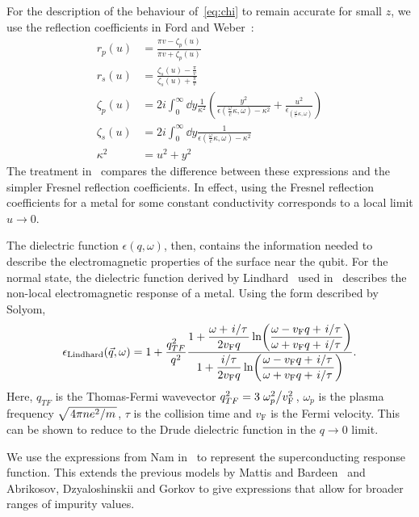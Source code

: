 \documentclass{article}
\newcommand{\vf}{v_{\mathrm{F}}}
\begin{document}
For the description of the behaviour of~\eqref{eq:chi} to remain accurate for small $z$, we use the reflection coefficients in Ford and Weber~\cite{Ford1984}:
\begin{align}
	r_p(u) &= \frac{\pi v - \zeta_p(u)}{\pi v + \zeta_p(u)} \\
	r_s(u) &= \frac{\zeta_s(u) - \frac{\pi}{v}}{\zeta_s(u) + \frac{\pi}{v}} \\
	\zeta_p(u) &= 2i \int_0^\infty \dd{y} \frac{1}{\kappa^2} \left( \frac{y^2}{\epsilon(\frac{\omega}{c}\kappa, \omega) - \kappa^2} + \frac{u^2}{\epsilon_(\frac{\omega}{c}\kappa, \omega)} \right) \label{eq:zp} \\
	\zeta_s(u) &= 2i \int_0^\infty \dd{y} \frac{1}{\epsilon(\frac{\omega}{c}\kappa, \omega) - \kappa^2} \label{eq:zs} \\
	\kappa^2 &= u^2 + y^2
\end{align}
The treatment in~\cite{QubitRelax} compares the difference between these expressions and the simpler Fresnel reflection coefficients.
In effect, using the Fresnel reflection coefficients for a metal for some constant conductivity corresponds to a local limit $u \rightarrow 0$.

The dielectric function $\epsilon(q, \omega)$, then, contains the information needed to describe the electromagnetic properties of the surface near the qubit.
For the normal state, the dielectric function derived by Lindhard~\cite{Lindhard} used in~\cite{QubitRelax} describes the non-local electromagnetic response of a metal.
Using the form described by Solyom\cite{SolyomV3},
\begin{equation}
	\epsilon_{\mathrm{Lindhard}}(\vec{q}, \omega) = 1 + \frac{q_{TF}^2}{q^2}\frac{\displaystyle 1 + \frac{\omega + \flatfrac{i}{\tau}}{2 \vf q} \ln(\frac{\omega - \vf q + \flatfrac{i}{\tau}}{\omega + \vf q + \flatfrac{i}{\tau}})}{\displaystyle 1 + \frac{\flatfrac{i}{\tau}}{2 \vf q} \ln(\frac{\omega - \vf q + \flatfrac{i}{\tau}}{\omega + \vf q + \flatfrac{i}{\tau}})}. \label{eq:lindhardsolyom}
\end{equation}
Here, $q_{TF}$ is the Thomas-Fermi wavevector $q_{TF}^2 = 3 \flatfrac{\omega_p^2}{\vf^2}$, $\omega_p$ is the plasma frequency $\sqrt{\flatfrac{4 \pi n e^2}{m}}$, $\tau$ is the collision time and $\vf$ is the Fermi velocity.
This can be shown to reduce to the Drude dielectric function in the $q \rightarrow 0$ limit.

We use the expressions from Nam in~\cite{Nam1967} to represent the superconducting response function.
This extends the previous models by Mattis and Bardeen~\cite{Mattis} and Abrikosov, Dzyaloshinskii and Gorkov\cite{AGD} to give expressions that allow for broader ranges of impurity values.
\end{document}
